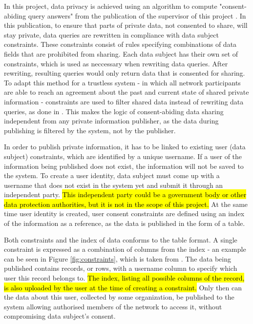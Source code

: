 \documentclass[12pt]{article}
\begin{document}
    In this project, data privacy is achieved using an algorithm to compute "consent-abiding query answers" from the publication of the supervisor of this project \cite{konstantinidis}. In this publication, to ensure that parts of private data, not consented to share, will stay private, data queries are rewritten in compliance with data subject constraints. These constraints consist of rules specifying combinations of data fields that are prohibited from sharing. Each data subject has their own set of constraints, which is used as neccessary when rewriting data queries. After rewriting, resulting queries would only return data that is consented for sharing. To adapt this method for a trustless system - in which all network participants are able to reach an agreement about the past and current state of shared private information - constraints are used to filter shared data instead of rewriting data queries, as done in \cite{konstantinidis}. This makes the logic of consent-abiding data sharing independent from any private information publisher, as the data during publishing is filtered by the system, not by the publisher.

    In order to publish private information, it has to be linked to existing user (data subject) constraints, which are identified by a unique username. If a user of the information being published does not exist, the information will not be saved to the system. To create a user identity, data subject must come up with a username that does not exist in the system yet and submit it through an independent party. \hl{This independent party could be a government body or other data protection authorities, but it is not in the scope of this project.} At the same time user identity is created, user consent constraints are defined using an index of the information as a reference, as the data is published in the form of a table.

    Both constraints and the index of data conforms to the table format. A single constraint is expressed as a combination of columns from the index - an example can be seen in Figure \ref{fig:constraints}, which is taken from \cite{konstantinidis}. The data being published contains records, or rows, with a username column to specify which user this record belongs to. \hl{The index, listing all possible columns of the record, is also uploaded by the user at the time of creating a constraint.} Only then can the data about this user, collected by some organization, be published to the system allowing authorised members of the network to access it, without compromising data subject's consent.
\end{document}
